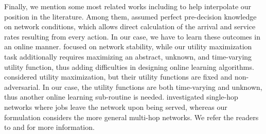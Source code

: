 \documentclass[11pt,fullpage,letterpaper]{article} %
\begin{document}
Finally, we mention some most related works including \citep{neely2010universal,liang2018minimizing,liang2018network,huang2023queue,yang2023learning} to help interpolate our position in the literature.
Among them, \citet{neely2010universal,liang2018minimizing,liang2018network} assumed perfect pre-decision knowledge on network conditions, which allows direct calculation of the arrival and service rates resulting from every action. In our case, we have to learn these outcomes in an online manner.
\citet{liang2018minimizing,huang2023queue,yang2023learning} focused on network stability, while our utility maximization task additionally requires maximizing an abstract, unknown, and time-varying utility function, thus adding difficulties in designing online learning algorithms.
\citet{neely2010universal,liang2018network} considered utility maximization, but their utility functions are fixed and non-adversarial. In our case, the utility functions are both time-varying and unknown, thus another online learning sub-routine is needed.
\citet{huang2023queue,yang2023learning} investigated single-hop networks where jobs leave the network upon being served, whereas our formulation considers the more general multi-hop networks.
We refer the readers to  and  for more information.
\end{document}
